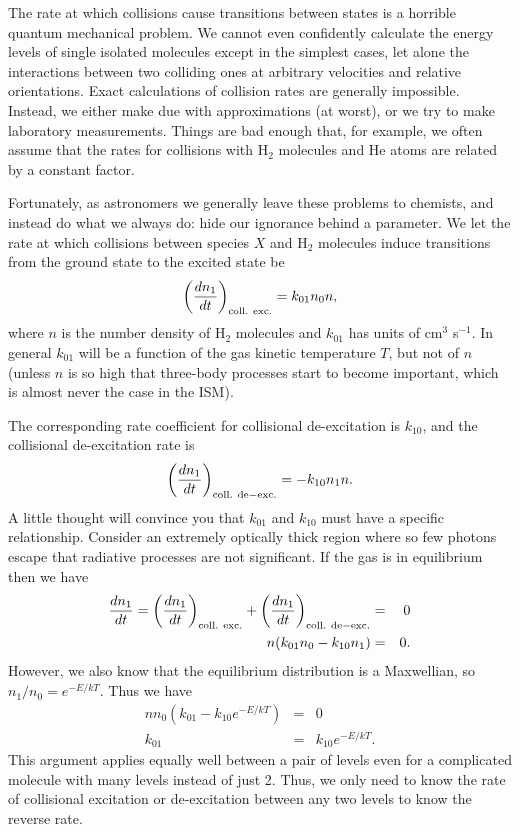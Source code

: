 The rate at which collisions cause transitions between states is a horrible quantum mechanical problem. We cannot even confidently calculate the energy levels of single isolated molecules except in the simplest cases, let alone the interactions between two colliding ones at arbitrary velocities and relative orientations. Exact calculations of collision rates are generally impossible. Instead, we either make due with approximations (at worst), or we try to make laboratory measurements. Things are bad enough that, for example, we often assume that the rates for collisions with H$_2$ molecules and He atoms are related by a constant factor.

Fortunately, as astronomers we generally leave these problems to chemists, and instead do what we always do: hide our ignorance behind a parameter. We let the rate at which collisions between species $X$ and H$_2$ molecules induce transitions from the ground state to the excited state be
\begin{equation}
\left(\frac{dn_1}{dt}\right)_{\rm coll.~exc.} = k_{01} n_0 n,
\end{equation}
where $n$ is the number density of H$_2$ molecules and $k_{01}$ has units of cm$^3$ s$^{-1}$. In general $k_{01}$ will be a function of the gas kinetic temperature $T$, but not of $n$ (unless $n$ is so high that three-body processes start to become important, which is almost never the case in the ISM). 

The corresponding rate coefficient for collisional de-excitation is $k_{10}$, and the collisional de-excitation rate is
\begin{equation}
\left(\frac{dn_1}{dt}\right)_{\rm coll.~de-exc.} = -k_{10} n_1 n.
\end{equation}
A little thought will convince you that $k_{01}$ and $k_{10}$ must have a specific relationship. Consider an extremely optically thick region where so few photons escape that radiative processes are not significant. If the gas is in equilibrium then we have
\begin{eqnarray}
\frac{dn_1}{dt} = \left(\frac{dn_1}{dt}\right)_{\rm coll.~exc.} + \left(\frac{dn_1}{dt}\right)_{\rm coll.~de-exc.} & = & 0 \\
n (k_{01} n_0 - k_{10} n_1) & = & 0.
\end{eqnarray}
However, we also know that the equilibrium distribution is a Maxwellian, so $n_1/n_0 = e^{-E/kT}$. Thus we have
\begin{eqnarray}
n n_0 (k_{01} - k_{10} e^{-E/kT}) & = & 0 \\
k_{01} & = & k_{10} e^{-E/kT}.
\end{eqnarray}
This argument applies equally well between a pair of levels even for a complicated molecule with many levels instead of just 2. Thus, we only need to know the rate of collisional excitation or de-excitation between any two levels to know the reverse rate.

